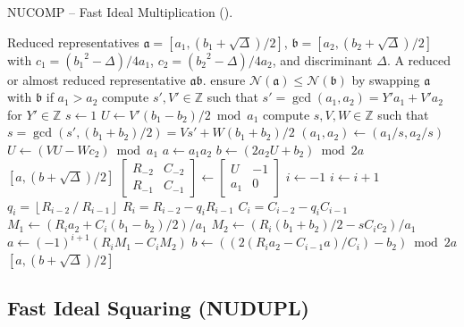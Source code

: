 \documentclass{ucalgthes1}
\theoremstyle{definition}
\newcommand{\ZZ}{\mathbb{Z}}
\newcommand{\matrixtt}[4]{\left[ \begin{array}{rr} #1 & #2 \\ #3 & #4 \end{array} \right]}
\newcommand{\floor}[1]{\left\lfloor #1 \right\rfloor}
\newcommand{\ideal}{\mathfrak}
\begin{document}
\begin{algorithm}[htb]
\caption{NUCOMP -- Fast Ideal Multiplication (\cite[pp.441-443]{Jacobson2009}).}
\label{alg:nucomp}
\begin{algorithmic}[1]
\Require Reduced representatives $\mathfrak a = [a_1, (b_1+\sqrt\Delta)/2]$, $\mathfrak b = [a_2, (b_2+\sqrt\Delta)/2]$ with $c_1 = ({b_1}^2-\Delta)/4a_1$, $c_2 = ({b_2}^2-\Delta)/4a_2$, and discriminant $\Delta$.
\Ensure A reduced or almost reduced representative $\mathfrak a \mathfrak b$.
\State ensure $\mathcal N(\ideal a) \le \mathcal N(\ideal b)$ by swapping $\mathfrak a$ with $\mathfrak b$ if $a_1 > a_2$
\State compute $s', V' \in \ZZ$ such that $s' = \gcd(a_1, a_2) = Y'a_1 + V'a_2$ for $Y' \in \ZZ$
\State $s \gets 1$
\State $U \gets V'(b_1 - b_2)/2 \bmod a_1$
	\State compute $s, V, W \in \ZZ$ such that $s = \gcd(s', (b_1 + b_2)/2) = Vs' + W(b_1 + b_2)/2$
	\State $(a_1, a_2) \gets (a_1/s, a_2/s)$
	\State $U \gets (VU - Wc_2) \bmod a_1$
\EndIf
{}
	\State $a \gets a_1a_2$
	\State $b \gets (2a_2U + b_2) \bmod{2a}$
	\State \Return $[a, (b+\sqrt\Delta)/2]$
\EndIf
\State $\matrixtt{R_{-2}}{C_{-2}}{R_{-1}}{C_{-1}} \gets \matrixtt{U}{-1}{a_1}{0}$
\State $i \gets -1$
	\State $i \gets i + 1$
	\State $q_i = \floor{R_{i-2} ~/~ R_{i-1}}$
	\State $R_i = R_{i-2}-q_i R_{i-1}$
	\State $C_i=C_{i-2}-q_i C_{i-1}$
\EndWhile
\State $M_1 \gets (R_i a_2 + C_i(b_1-b_2)/2)/a_1$ 
\State $M_2 \gets (R_i (b_1+b_2)/2 -sC_i c_2)/a_1$
\State $a \gets (-1)^{i+1}(R_i M_1 - C_i M_2)$
\State $b \gets ((2(R_i a_2 - C_{i-1} a)/C_i) - b_2) \bmod{2a}$ 
\State \Return $[a, (b+\sqrt\Delta)/2]$ 
\end{algorithmic}
\end{algorithm}


\subsection{Fast Ideal Squaring (NUDUPL)}
\label{subsec:nudupl}
\end{document}
